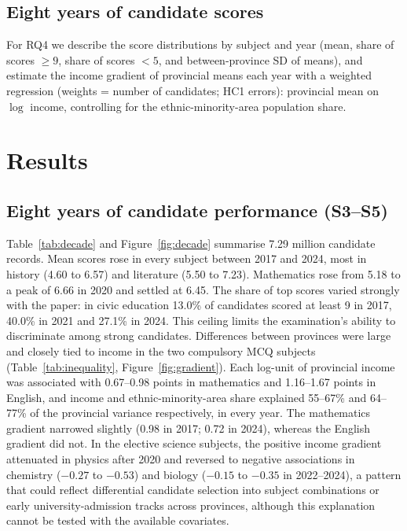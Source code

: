 \documentclass[preprint,12pt,authoryear,nonatbib]{elsarticle}
\begin{document}
\subsection{Eight years of candidate scores}
For RQ4 we describe the score distributions by subject and year (mean, share of scores $\geq 9$, share of scores $< 5$, and between-province SD of means), and estimate the income gradient of provincial means each year with a weighted regression (weights = number of candidates; HC1 errors): provincial mean on $\log$ income, controlling for the ethnic-minority-area population share.

\section{Results}
\subsection{Eight years of candidate performance (S3--S5)}
Table~\ref{tab:decade} and Figure~\ref{fig:decade} summarise 7.29 million candidate records. Mean scores rose in every subject between 2017 and 2024, most in history (4.60 to 6.57) and literature (5.50 to 7.23). Mathematics rose from 5.18 to a peak of 6.66 in 2020 and settled at 6.45. The share of top scores varied strongly with the paper: in civic education 13.0\% of candidates scored at least 9 in 2017, 40.0\% in 2021 and 27.1\% in 2024. This ceiling limits the examination's ability to discriminate among strong candidates. Differences between provinces were large and closely tied to income in the two compulsory MCQ subjects (Table~\ref{tab:inequality}, Figure~\ref{fig:gradient}). Each log-unit of provincial income was associated with 0.67--0.98 points in mathematics and 1.16--1.67 points in English, and income and ethnic-minority-area share explained 55--67\% and 64--77\% of the provincial variance respectively, in every year. The mathematics gradient narrowed slightly (0.98 in 2017; 0.72 in 2024), whereas the English gradient did not. In the elective science subjects, the positive income gradient attenuated in physics after 2020 and reversed to negative associations in chemistry ($-0.27$ to $-0.53$) and biology ($-0.15$ to $-0.35$ in 2022--2024), a pattern that could reflect differential candidate selection into subject combinations or early university-admission tracks across provinces, although this explanation cannot be tested with the available covariates.

\begin{table}[H]\centering\footnotesize
\caption{Candidate scores by subject, 2017--2024 (S3)}\label{tab:decade}

\end{table}
\end{document}
